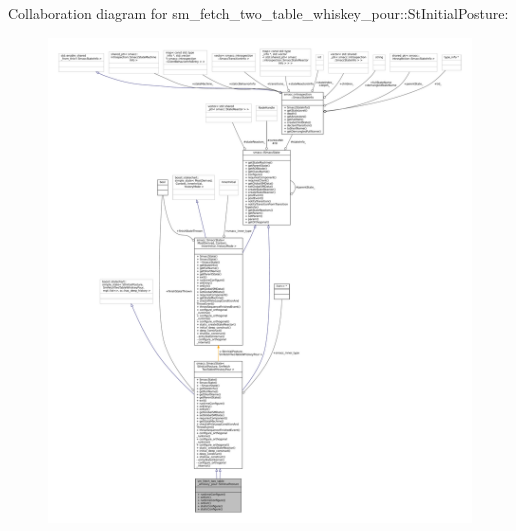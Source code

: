 Collaboration diagram for sm\+\_\+fetch\+\_\+two\+\_\+table\+\_\+whiskey\+\_\+pour\+:\+:St\+Initial\+Posture\+:
\nopagebreak
\begin{figure}[H]
\begin{center}
\leavevmode
\includegraphics[width=350pt]{structsm__fetch__two__table__whiskey__pour_1_1StInitialPosture__coll__graph}
\end{center}
\end{figure}
